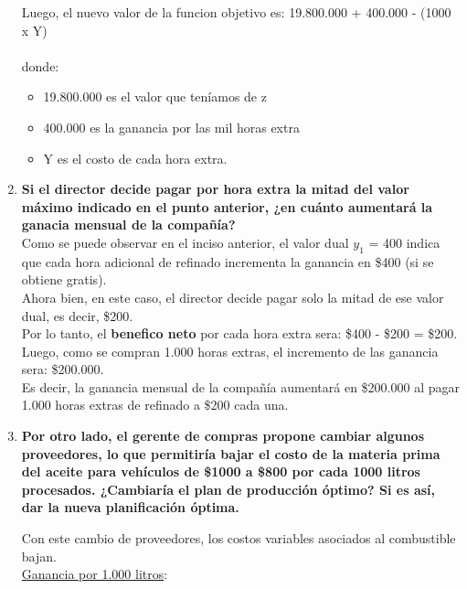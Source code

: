 \documentclass[10pt,a4paper]{article}
\begin{document}
\begin{enumerate}[label=\textbf{\sffamily\large\arabic*.}]
    \vspace{1em}
Luego, el nuevo valor de la funcion objetivo es: 19.800.000 + 400.000 - (1000 x Y)
\\
\\
donde:
\begin{itemize}
\item 19.800.000 es el valor que teníamos de z
\item 400.000 es la ganancia por las mil horas extra
\item Y es el costo de cada hora extra.
\end{itemize}

\vspace{1em}
    \item {\bfseries\large Si el director decide pagar por hora extra la mitad del valor máximo indicado en el punto anterior, ¿en cuánto
    aumentará la ganacia mensual de la compañía?} \\

    Como se puede observar en el inciso anterior, el valor dual $y_{1}$ = 400 indica que cada hora adicional de refinado incrementa la ganancia en \$400 (si
    se obtiene gratis). \\

    Ahora bien, en este caso, el director decide pagar solo la mitad de ese valor dual, es decir, \$200.\\
    Por lo tanto, el \textbf{benefico neto} por cada hora extra sera: \$400 - \$200 = \$200. \\
    Luego, como se compran 1.000 horas extras, el incremento de las ganancia sera: \$200.000.\\

    Es decir, la ganancia mensual de la compañía aumentará en \$200.000 al pagar 1.000 horas extras de refinado a \$200 cada una.
\vspace{1em}
    \item {\bfseries\large Por otro lado, el gerente de compras propone cambiar algunos proveedores, lo que permitiría bajar el costo
    de la materia prima del aceite para vehículos de \$1000 a \$800 por cada 1000 litros procesados. ¿Cambiaría el
    plan de producción óptimo? Si es así, dar la nueva planificación óptima.}
    \vspace{1em}

    Con este cambio de proveedores, los costos variables asociados al combustible bajan. \\

    \underline{Ganancia por 1.000 litros}:


\end{enumerate}
\end{document}

